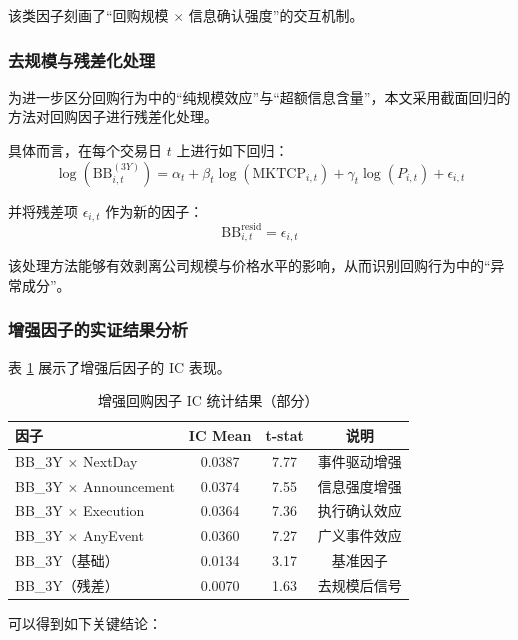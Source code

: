 \documentclass[a4paper,10pt]{article}
\begin{document}
该类因子刻画了“回购规模 $\times$ 信息确认强度”的交互机制。

\subsubsection{去规模与残差化处理}

为进一步区分回购行为中的“纯规模效应”与“超额信息含量”，本文采用截面回归的方法对回购因子进行残差化处理。

具体而言，在每个交易日 $t$ 上进行如下回归：
\begin{equation}
\log(\text{BB}^{(3Y)}_{i,t}) = \alpha_t + \beta_t \log(\text{MKTCP}_{i,t}) + \gamma_t \log(P_{i,t}) + \epsilon_{i,t}
\end{equation}

并将残差项 $\epsilon_{i,t}$ 作为新的因子：
\begin{equation}
\text{BB}^{\text{resid}}_{i,t} = \epsilon_{i,t}
\end{equation}

该处理方法能够有效剥离公司规模与价格水平的影响，从而识别回购行为中的“异常成分”。

\subsubsection{增强因子的实证结果分析}

表 \ref{tab:enhanced_ic} 展示了增强后因子的 IC 表现。

\begin{table}[H]
\centering
\caption{增强回购因子 IC 统计结果（部分）}
\label{tab:enhanced_ic}
\begin{tabular}{lccc}
\toprule
因子 & IC Mean & t-stat & 说明 \\
\midrule
BB\_3Y $\times$ NextDay & 0.0387 & 7.77 & 事件驱动增强 \\
BB\_3Y $\times$ Announcement & 0.0374 & 7.55 & 信息强度增强 \\
BB\_3Y $\times$ Execution & 0.0364 & 7.36 & 执行确认效应 \\
BB\_3Y $\times$ AnyEvent & 0.0360 & 7.27 & 广义事件效应 \\
BB\_3Y（基础） & 0.0134 & 3.17 & 基准因子 \\
BB\_3Y（残差） & 0.0070 & 1.63 & 去规模后信号 \\
\bottomrule
\end{tabular}
\end{table}

可以得到如下关键结论：
\end{document}
